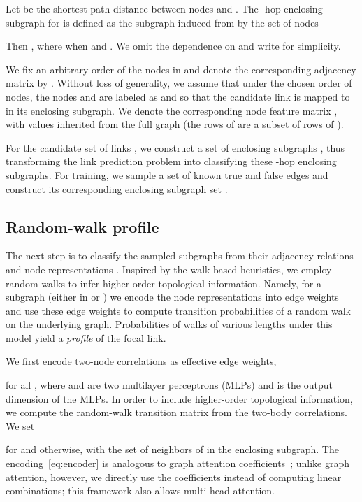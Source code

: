 \documentclass[11pt]{article}
\newcommand{\UPDATE}[1]{\textcolor{WowColor}{{#1}}}
\newcommand{\fTBD}[1]{\textcolor{SubtleColor}{}\marginnote{\tiny\textcolor{SubtleColor}{ {\tiny } #1}}}
\renewcommand{\fTBD}[1]{}
\renewcommand{\UPDATE}[1]{#1}
\begin{document}
Let  be the shortest-path distance between nodes  and . The -hop enclosing subgraph  for  is defined as the subgraph induced from  by the set of nodes 
\vspace{-1mm}

\vspace{-1mm}
Then , where  when  and . We omit the dependence on  and write  for simplicity.

We fix an arbitrary order of the nodes in  and denote the corresponding adjacency matrix by . Without loss of generality, we assume that under the chosen order of nodes, the nodes  and  are labeled as  and  so that the candidate link  is mapped to  in its enclosing subgraph. We denote the corresponding node feature matrix , with values inherited from the full graph (the rows of  are a subset of rows of ). 

For the candidate set of links , we construct a set of enclosing subgraphs , thus transforming the link prediction problem into classifying these -hop enclosing subgraphs. For training, we sample a set of known true and false edges  and construct its corresponding enclosing subgraph set .
\vspace{-2mm}
\subsection{Random-walk profile}
\label{sub:rwp}
\vspace{-2mm}

The next step is to classify the sampled subgraphs from their adjacency relations  and node representations .  Inspired by the walk-based heuristics, we employ random walks to infer higher-order topological information. Namely, for a subgraph \fTBD{Check that  is not used for the total link set.} (either in  or ) we encode the node representations  into edge weights and use these edge weights to compute transition probabilities of a random walk on the underlying graph. Probabilities of walks of various lengths under this model yield a \emph{profile} of the focal link.\fTBD{How about the name ``walkprints''?}

We first encode two-node correlations \UPDATE{as effective edge weights},

for all , where  and  are two multilayer perceptrons (MLPs) and  is the output dimension of the MLPs. In order to include higher-order topological information, we compute the random-walk transition matrix  from the two-body correlations. We set

for  and  otherwise,
with  the set of neighbors of  in the enclosing subgraph. The encoding~\eqref{eq:encoder} is analogous to graph attention coefficients~\citep{velivckovic2017graph,shi2020masked}; unlike graph attention, however, we directly use the coefficients instead of computing linear combinations;  this framework also allows multi-head attention.
\end{document}
